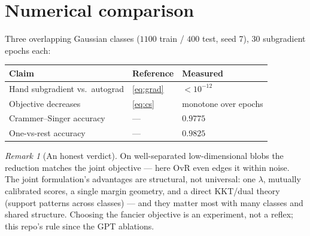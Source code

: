 \documentclass[11pt]{article}
\theoremstyle{remark}
\newtheorem{remark}{Remark}
\begin{document}
\section{Numerical comparison}

Three overlapping Gaussian classes ($1100$ train / $400$ test,
seed 7), $30$ subgradient epochs each:

\begin{center}
\begin{tabular}{lll}
\toprule
Claim & Reference & Measured\\
\midrule
Hand subgradient vs.\ autograd & \eqref{eq:grad} & $< 10^{-12}$\\
Objective decreases & \eqref{eq:cs} & monotone over epochs\\
Crammer--Singer accuracy & --- & $0.9775$\\
One-vs-rest accuracy & --- & $0.9825$\\
\bottomrule
\end{tabular}
\end{center}

\begin{remark}[An honest verdict]
On well-separated low-dimensional blobs the reduction matches the
joint objective --- here OvR even edges it within noise. The joint
formulation's advantages are structural, not universal: one
$\lambda$, mutually calibrated scores, a single margin geometry, and
a direct KKT/dual theory (support patterns across classes) --- and
they matter most with many classes and shared structure. Choosing
the fancier objective is an experiment, not a reflex; this repo's
rule since the GPT ablations.
\end{remark}
\end{document}
